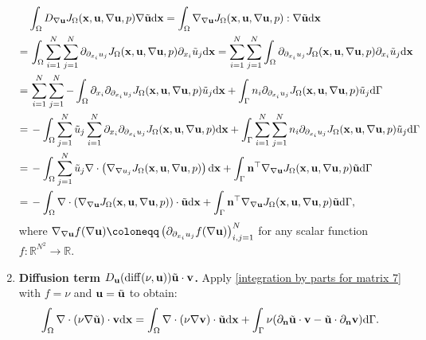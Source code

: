 \documentclass[oneside,11pt]{book}
\numberwithin{equation}{section}
\begin{document}
\begin{enumerate}[leftmargin=0mm]
    \begin{align*}
        &\int_\Omega D_{\nabla{\bf u}} J_\Omega({\bf x},{\bf u},\nabla{\bf u},p)\nabla\tilde{\bf u}{\rm d}{\bf x} = \int_\Omega \nabla_{\nabla{\bf u}}J_\Omega({\bf x},{\bf u},\nabla{\bf u},p):\nabla\tilde{\bf u}{\rm d}{\bf x}\\
        =&\,\int_\Omega \sum_{i=1}^N\sum_{j=1}^N \partial_{\partial_{x_i}u_j}J_\Omega({\bf x},{\bf u},\nabla{\bf u},p)\partial_{x_i}\tilde{u}_j{\rm d}{\bf x} = \sum_{i=1}^N\sum_{j=1}^N \int_\Omega \partial_{\partial_{x_i}u_j}J_\Omega({\bf x},{\bf u},\nabla{\bf u},p)\partial_{x_i}\tilde{u}_j{\rm d}{\bf x}\\
        =&\, \sum_{i=1}^N\sum_{j=1}^N -\int_\Omega \partial_{x_i}\partial_{\partial_{x_i}u_j}J_\Omega({\bf x},{\bf u},\nabla{\bf u},p)\tilde{u}_j{\rm d}{\bf x} + \int_\Gamma n_i\partial_{\partial_{x_i}u_j}J_\Omega({\bf x},{\bf u},\nabla{\bf u},p)\tilde{u}_j{\rm d}\Gamma\\
        =&\, -\int_\Omega \sum_{j=1}^N \tilde{u}_j\sum_{i=1}^N \partial_{x_i}\partial_{\partial_{x_i}u_j}J_\Omega({\bf x},{\bf u},\nabla{\bf u},p){\rm d}{\bf x} + \int_\Gamma \sum_{i=1}^N\sum_{j=1}^N n_i\partial_{\partial_{x_i}u_j}J_\Omega({\bf x},{\bf u},\nabla{\bf u},p)\tilde{u}_j{\rm d}\Gamma\\
        =&\, -\int_\Omega \sum_{j=1}^N \tilde{u}_j\nabla\cdot\left(\nabla_{\nabla u_j}J_\Omega({\bf x},{\bf u},\nabla{\bf u},p)\right){\rm d}{\bf x} + \int_\Gamma {\bf n}^\top\nabla_{\nabla{\bf u}}J_\Omega({\bf x},{\bf u},\nabla{\bf u},p)\tilde{\bf u}{\rm d}\Gamma\\
        =&\, -\int_\Omega \nabla\cdot\left(\nabla_{\nabla{\bf u}}J_\Omega({\bf x},{\bf u},\nabla{\bf u},p)\right)\cdot\tilde{\bf u}{\rm d}{\bf x} + \int_\Gamma {\bf n}^\top\nabla_{\nabla{\bf u}}J_\Omega({\bf x},{\bf u},\nabla{\bf u},p)\tilde{\bf u}{\rm d}\Gamma,
    \end{align*}
    where $\nabla_{\nabla{\bf u}} f(\nabla{\bf u})\coloneqq\left(\partial_{\partial_{x_i}u_j}f(\nabla{\bf u})\right)_{i,j=1}^N$ for any scalar function $f:\mathbb{R}^{N^2}\to\mathbb{R}$.
    \item \textbf{Diffusion term $D_{\bf u}(\operatorname{diff}(\nu,{\bf u}))\tilde{\bf u}\cdot{\bf v}$.} Apply \eqref{integration by parts for matrix 7} with $f = \nu$ and ${\bf u} = \tilde{\bf u}$ to obtain:
    \begin{align*}
        \int_\Omega \nabla\cdot(\nu\nabla\tilde{\bf u})\cdot{\bf v}{\rm d}{\bf x} = \int_\Omega \nabla\cdot(\nu\nabla{\bf v})\cdot\tilde{\bf u}{\rm d}{\bf x} + \int_\Gamma \nu(\partial_{\bf n}\tilde{\bf u}\cdot{\bf v} - \tilde{\bf u}\cdot\partial_{\bf n}{\bf v}){\rm d}\Gamma.

\end{align*}
\end{enumerate}
\end{document}
